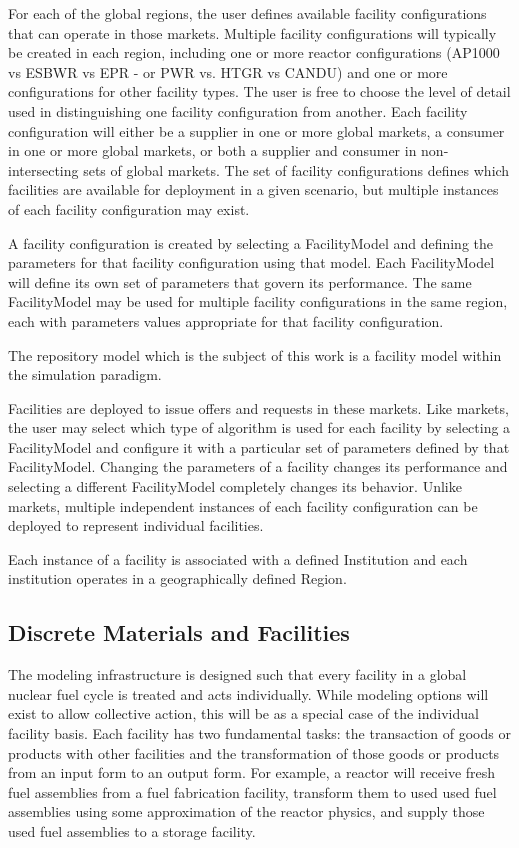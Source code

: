For each of the global regions, the user defines available facility 
configurations that can operate in those markets.  Multiple facility 
configurations will typically be created in each region, including one 
or more reactor configurations (AP1000 vs ESBWR vs EPR - or PWR vs.  
HTGR vs CANDU) and one or more configurations for other facility 
types.  The user is free to choose the level of detail used in 
distinguishing one facility configuration from another.  Each facility 
configuration will either be a supplier in one or more global markets, 
a consumer in one or more global markets, or both a supplier and 
consumer in non-intersecting sets of global markets.  The set of 
facility configurations defines which facilities are available for 
deployment in a given scenario, but multiple instances of each 
facility configuration may exist.

A facility configuration is created by selecting a FacilityModel and 
defining the parameters for that facility configuration using that 
model.  Each FacilityModel will define its own set of parameters that 
govern its performance.  The same FacilityModel may be used for 
multiple facility configurations in the same region, each with 
parameters values appropriate for that facility configuration.

The repository model which is the subject of this work is a facility 
model within the \Cyclus simulation paradigm. 

Facilities are deployed to issue offers and requests in these markets.  
Like markets, the user may select which type of algorithm is used for 
each facility by selecting a FacilityModel and configure it with a 
particular set of parameters defined by that FacilityModel.  Changing 
the parameters of a facility changes its performance and selecting a 
different FacilityModel completely changes its behavior.  Unlike 
markets, multiple independent instances of each facility configuration 
can be deployed to represent individual facilities.

Each instance of a facility is associated with a defined Institution 
and each institution operates in a geographically defined Region.

\subsection{Discrete Materials and Facilities}

The \Cyclus modeling infrastructure is designed such that every
facility in a global nuclear fuel cycle is treated and acts
individually. While modeling options will exist to allow collective
action, this will be as a special case of the individual facility
basis. Each facility has two fundamental tasks: the transaction of
goods or products with other facilities and the transformation of
those goods or products from an input form to an output form.  For
example, a reactor will receive fresh fuel assemblies from a fuel
fabrication facility, transform them to used used fuel assemblies
using some approximation of the reactor physics, and supply those used
fuel assemblies to a storage facility.

